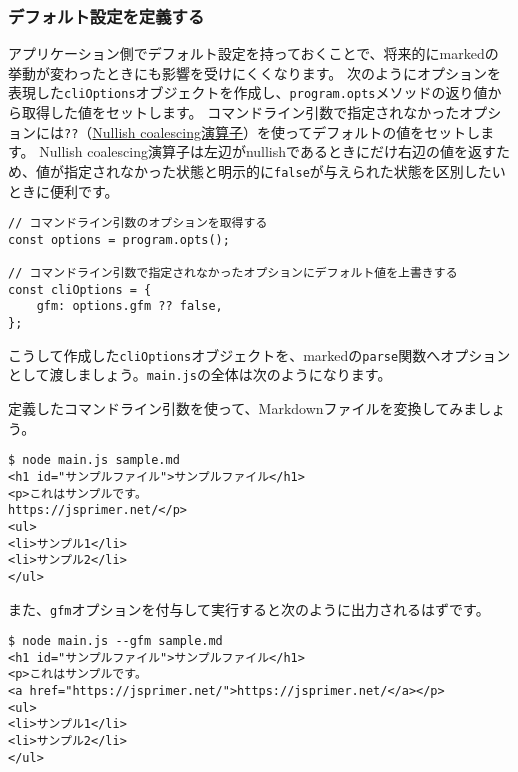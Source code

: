 \hypertarget{declare-default}{%
\subsubsection{デフォルト設定を定義する}\label{declare-default}}

アプリケーション側でデフォルト設定を持っておくことで、将来的にmarkedの挙動が変わったときにも影響を受けにくくなります。
次のようにオプションを表現した\texttt{cliOptions}オブジェクトを作成し、\texttt{program.opts}メソッドの返り値から取得した値をセットします。
コマンドライン引数で指定されなかったオプションには\texttt{??}（\href{https://jsprimer.net/basic/operator/#nullish-coalescing-operator}{Nullish coalescing演算子}）を使ってデフォルトの値をセットします。
Nullish coalescing演算子は左辺がnullishであるときにだけ右辺の値を返すため、値が指定されなかった状態と明示的に\texttt{false}が与えられた状態を区別したいときに便利です。

\begin{lstlisting}
// コマンドライン引数のオプションを取得する
const options = program.opts();

// コマンドライン引数で指定されなかったオプションにデフォルト値を上書きする
const cliOptions = {
    gfm: options.gfm ?? false,
};
\end{lstlisting}

こうして作成した\texttt{cliOptions}オブジェクトを、markedの\texttt{parse}関数へオプションとして渡しましょう。\texttt{main.js}の全体は次のようになります。



定義したコマンドライン引数を使って、Markdownファイルを変換してみましょう。

\begin{lstlisting}
$ node main.js sample.md
<h1 id="サンプルファイル">サンプルファイル</h1>
<p>これはサンプルです。
https://jsprimer.net/</p>
<ul>
<li>サンプル1</li>
<li>サンプル2</li>
</ul>
\end{lstlisting}

また、\texttt{gfm}オプションを付与して実行すると次のように出力されるはずです。

\begin{lstlisting}
$ node main.js --gfm sample.md
<h1 id="サンプルファイル">サンプルファイル</h1>
<p>これはサンプルです。
<a href="https://jsprimer.net/">https://jsprimer.net/</a></p>
<ul>
<li>サンプル1</li>
<li>サンプル2</li>
</ul>
\end{lstlisting}

